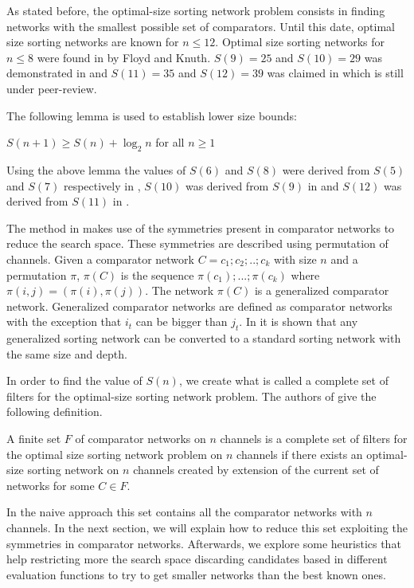 \documentclass[../main.tex]{subfiles}
\begin{document}
	As stated before, the optimal-size sorting network problem consists in finding networks with the smallest possible set of comparators. Until this date, optimal size sorting networks are known for $n \leq 12$. Optimal size sorting networks for $n \leq 8$ were found in \cite{FLOYD1973163} by Floyd and Knuth. $S(9)=25$ and $S(10)=29$ was demonstrated in \cite{sortingnineinputs} and $S(11)=35$ and $S(12)=39$ was claimed in \cite{harder2021answer} which is still under peer-review. 
	
	The following lemma \cite{VanVoorhis1972} is used to establish lower size bounds:
	
	\begin{lemma}
		$S(n+1) \geq S(n) + \log_2 n$ for all $n \geq 1$
	\end{lemma}

	Using the above lemma the values of $S(6)$ and $S(8)$ were derived from $S(5)$ and $S(7)$ respectively in \cite{FLOYD1973163}, $S(10)$ was derived from $S(9)$ in \cite{sortingnineinputs} and $S(12)$ was derived from $S(11)$ in \cite{harder2021answer}.
	
	The method in \cite{sortingnineinputs} makes use of the symmetries present in comparator networks to reduce the search space. These symmetries are described using permutation of channels. Given a comparator network $C=c_1;c_2;..;c_k$ with size $n$ and a permutation $\pi$, $\pi(C)$ is the sequence $\pi(c_1);...;\pi(c_k)$ where $\pi(i,j)=(\pi(i),\pi(j))$. The network $\pi(C)$ is a generalized comparator network. Generalized comparator networks are defined as comparator networks with the exception that $i_t$ can be bigger than $j_t$. In \cite{knuth1997art} it is shown that any generalized sorting network can be converted to a standard sorting network with the same size and depth.
	
	In order to find the value of $S(n)$, we create what is called a complete set of filters for the optimal-size sorting network problem. The authors of \cite{sortingnineinputs} give the following definition. 
	
	\begin{definition}
		A finite set $F$ of comparator networks on $n$ channels is a complete set of filters for the optimal size sorting network problem on $n$ channels if there exists an optimal-size sorting network on $n$ channels created by extension of the current set of networks for some $C \in F$.
	\end{definition}
	
	In the naive approach this set contains all the comparator networks with $n$ channels. In the next section, we will explain how to reduce this set exploiting the symmetries in comparator networks. Afterwards, we explore some heuristics that help restricting more the search space discarding candidates based in different evaluation functions to try to get smaller networks than the best known ones.
	\newpage
\end{document}
